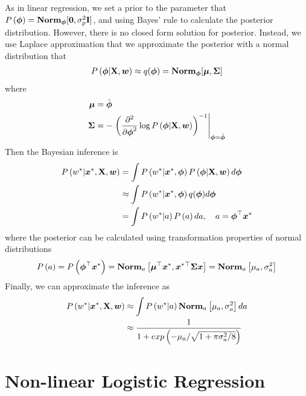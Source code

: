 As in linear regression, we set a prior to the parameter that $P\left(\boldsymbol{\phi}\right)=\mathbf{Norm}_{\boldsymbol{\phi}}[\boldsymbol{0},\sigma_p^2\mathbf{I}]$, and using Bayes' rule to calculate the posterior distribution. However, there is no closed form solution for posterior. Instead, we use Laplace approximation that we approximate the posterior with a normal distribution that
\begin{align*}
	P\left(\boldsymbol{\phi}|\mathbf{X},\boldsymbol{w}\right)\approx q(\boldsymbol{\phi})=\mathbf{Norm}_{\boldsymbol{\phi}}[\boldsymbol{\mu},\boldsymbol{\Sigma}]
\end{align*}
where
\begin{align*}
	\boldsymbol{\mu}&=\hat{\boldsymbol{\phi}} \\
	\boldsymbol{\Sigma}&=-\left.\left(\frac{\partial^2}{\partial\boldsymbol{\phi}^2}\log P\left(\boldsymbol{\phi}|\mathbf{X},\boldsymbol{w}\right)\right)^{-1}\right|_{\boldsymbol{\phi}=\hat{\boldsymbol{\phi}}}
\end{align*}
Then the Bayesian inference is
\begin{align*}
	P\left(w^*|\boldsymbol{x}^*,\mathbf{X},\boldsymbol{w}\right)&=\int P\left(w^*|\boldsymbol{x}^*,\boldsymbol{\phi}\right)P\left(\boldsymbol{\phi}|\mathbf{X},\boldsymbol{w}\right)d\boldsymbol{\phi} \\
	&\approx\int P\left(w^*|\boldsymbol{x}^*,\boldsymbol{\phi}\right)q(\boldsymbol{\phi})d\boldsymbol{\phi} \\
	&=\int P\left(w^*|a\right)P\left(a\right)da,\quad a=\boldsymbol{\phi}^\top\boldsymbol{x}^*
\end{align*}
where the posterior can be calculated using transformation properties of normal distributions
\begin{align*}
	P\left(a\right)=P\left(\boldsymbol{\phi}^\top\boldsymbol{x}^*\right)=\mathbf{Norm}_a\left[\boldsymbol{\mu}^\top\boldsymbol{x}^*,\boldsymbol{x}^*{}^\top\boldsymbol{\Sigma}\boldsymbol{x}\right]=\mathbf{Norm}_a\left[\mu_a,\sigma_a^2\right]
\end{align*}
Finally, we can approximate the inference as
\begin{align*}
	P\left(w^*|\boldsymbol{x}^*,\mathbf{X},\boldsymbol{w}\right)&\approx\int P\left(w^*|a\right)\mathbf{Norm}_a\left[\mu_a,\sigma_a^2\right]da \\
	&\approx\frac{1}{1+exp\left(-\mu_a/\sqrt{1+\pi\sigma_a^2/8}\right)}
\end{align*}



\section{Non-linear Logistic Regression}
\label{section7.3}

